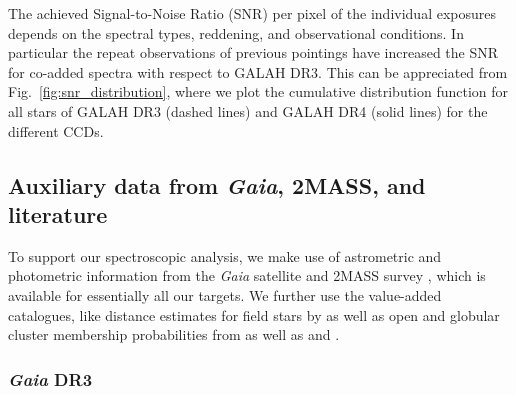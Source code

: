 \documentclass[
  journal=pasa,
  manuscript=research-paper, %
  year=2024,
  volume=37
]{cup-journal}
\newcommand{\Gaia}{\textit{Gaia}\xspace}
\begin{document}
The achieved Signal-to-Noise Ratio (SNR) per pixel of the individual exposures depends on the spectral types, reddening, and observational conditions. In particular the repeat observations of previous pointings have increased the SNR for co-added spectra with respect to GALAH DR3. This can be appreciated from Fig.~\ref{fig:snr_distribution}, where we plot the cumulative distribution function for all stars of GALAH DR3 (dashed lines) and GALAH DR4 (solid lines) for the different CCDs. 

\subsection{Auxiliary data from \Gaia, 2MASS, and literature} \label{sec:non-spec_data}


To support our spectroscopic analysis, we make use of astrometric and photometric information from the \Gaia satellite \citep{Gaia-Collaboration2016} and 2MASS survey \citep{Skrutskie2006}, which is available for essentially all our targets. We further use the value-added catalogues, like distance estimates for field stars by \citet{BailerJones2021} as well as open and globular cluster membership probabilities from \citet{CantatGaudin2020} as well as \citet{Vasiliev2021} and \citet{Baumgardt2021}.

\subsubsection{\Gaia DR3}
\end{document}
